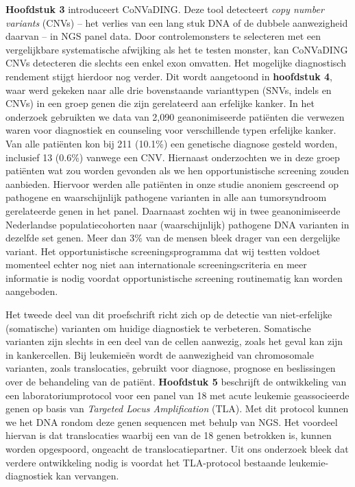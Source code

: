 \begin{appendices}
	\textbf{Hoofdstuk 3} introduceert CoNVaDING. Deze tool detecteert \textsl{copy number variants} (CNVs) – het verlies van een lang stuk DNA of de dubbele aanwezigheid daarvan – in NGS panel data. Door controlemonsters te selecteren met een vergelijkbare systematische afwijking als het te testen monster, kan CoNVaDING CNVs detecteren die slechts een enkel exon omvatten. Het mogelijke diagnostisch rendement stijgt hierdoor nog verder. Dit wordt aangetoond in \textbf{hoofdstuk 4}, waar werd gekeken naar alle drie bovenstaande varianttypen (SNVs, indels en CNVs) in een groep genen die zijn gerelateerd aan erfelijke kanker. In het onderzoek gebruikten we data van 2,090 geanonimiseerde patiënten die verwezen waren voor diagnostiek en counseling voor verschillende typen erfelijke kanker. Van alle patiënten kon bij 211 (10.1\%) een genetische diagnose gesteld worden, inclusief 13 (0.6\%) vanwege een CNV. \hfill \break Hiernaast onderzochten we in deze groep patiënten wat zou worden gevonden als we hen opportunistische screening zouden aanbieden. Hiervoor werden alle patiënten in onze studie anoniem gescreend op pathogene en waarschijnlijk pathogene varianten in alle aan tumorsyndroom gerelateerde genen in het panel. Daarnaast zochten wij in twee geanonimiseerde Nederlandse populatiecohorten naar (waarschijnlijk) pathogene DNA varianten in dezelfde set genen. Meer dan 3\% van de mensen bleek drager van een dergelijke variant. Het opportunistische screeningsprogramma dat wij testten voldoet momenteel echter nog niet aan internationale screeningscriteria en meer informatie is nodig voordat opportunistische screening routinematig kan worden aangeboden.
	
	Het tweede deel van dit proefschrift richt zich op de detectie van niet-erfelijke (somatische) varianten om huidige diagnostiek te verbeteren. Somatische varianten zijn slechts in een deel van de cellen aanwezig, zoals het geval kan zijn in kankercellen. Bij leukemieën wordt de aanwezigheid van chromosomale varianten, zoals translocaties, gebruikt voor diagnose, prognose en beslissingen over de behandeling van de patiënt. \textbf{Hoofdstuk 5} beschrijft de ontwikkeling van een laboratoriumprotocol voor een panel van 18 met acute leukemie geassocieerde genen op basis van \textsl{Targeted Locus Amplification} (TLA). Met dit protocol kunnen we het DNA rondom deze genen sequencen met behulp van NGS. Het voordeel hiervan is dat translocaties waarbij een van de 18 genen betrokken is, kunnen worden opgespoord, ongeacht de translocatiepartner. Uit ons onderzoek bleek dat verdere ontwikkeling nodig is voordat het TLA-protocol bestaande leukemie-diagnostiek kan vervangen. 
	

\end{appendices}
